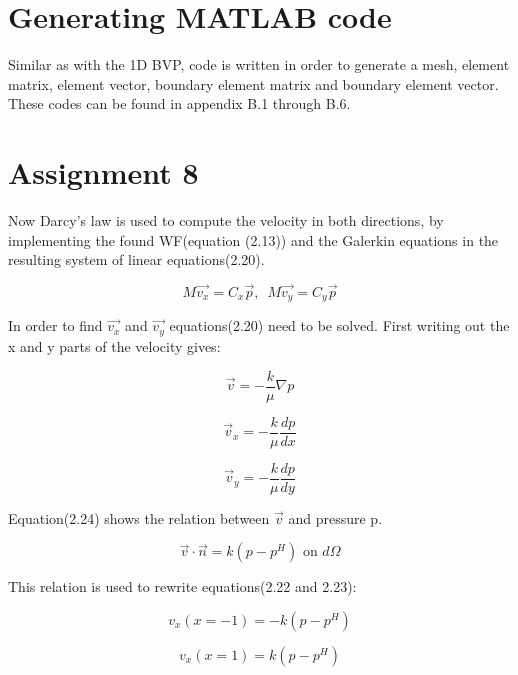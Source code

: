 \documentclass[a4paper]{report}
\begin{document}
\section{Generating MATLAB code}

Similar as with the 1D BVP, code is written in order to generate a mesh, element matrix, element vector, boundary element matrix and boundary element vector. These codes can be found in appendix B.1 through B.6. 





\section{Assignment 8}

Now Darcy's law is used to compute the velocity in both directions, by implementing the found WF(equation (2.13)) and the Galerkin equations in the resulting system of linear equations(2.20).

\begin{equation}
 M\vec{v_x}=C_x\vec{p},\,\,\, M\vec{v_y}=C_y\vec{p}
\end{equation}

In order to find $\vec{v_x}$ and $\vec{v_y}$ equations(2.20) need to be solved. First writing out the x and y parts of the velocity gives:

\begin{equation}
\vec{v}=-\frac{k}{\mu}\nabla p
\end{equation}

\begin{equation}
\vec{v}_x=-\frac{k}{\mu}\frac{dp}{dx}
\end{equation}


\begin{equation}
\vec{v}_y=-\frac{k}{\mu}\frac{dp}{dy}
\end{equation}

Equation(2.24) shows the relation between $\vec{v}$ and pressure p.

\begin{equation}
\vec{v}\cdot\vec{n}=k(p-p^H)\text{ on }d\Omega
\end{equation}

This relation is used to rewrite equations(2.22 and 2.23):

\begin{equation}
v_x(x=-1)=-k(p-p^H)
\end{equation}


\begin{equation}
v_x(x=1)=k(p-p^H)
\end{equation}
\end{document}
